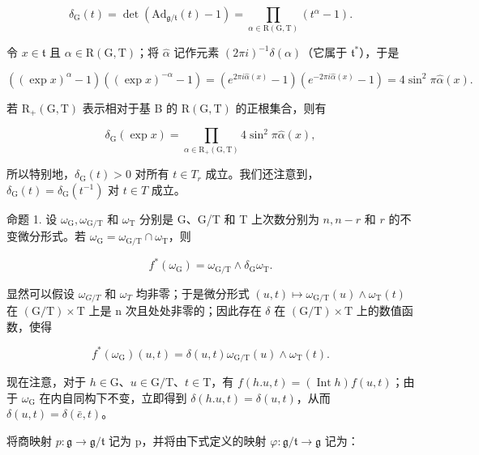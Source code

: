 \[
\delta_ {\mathrm{G}} (t) = \det (\mathrm{Ad} _ {\mathfrak {g} / \mathfrak {t}} (t) - 1) = \prod_ {\alpha \in \mathrm{R} (\mathrm{G}, \mathrm{T})} (t ^ {\alpha} - 1).\tag{3}
\]

令 \(x \in \mathfrak{t}\) 且 \(\alpha \in \mathrm{R}(\mathrm{G},\mathrm{T})\)；将 \(\hat{\alpha}\) 记作元素 \((2\pi i)^{-1}\delta (\alpha)\)（它属于 \(\mathfrak{t}^*\)），于是

\[
((\exp x) ^ {\alpha} - 1) ((\exp x) ^ {- \alpha} - 1) = (e ^ {2 \pi i \hat {\alpha} (x)} - 1) (e ^ {- 2 \pi i \hat {\alpha} (x)} - 1) = 4 \sin^ {2} \pi \hat {\alpha} (x).
\]

若 \(\mathrm{R}_{+}(\mathrm{G},\mathrm{T})\) 表示相对于基 B 的 \(\mathrm{R}(\mathrm{G},\mathrm{T})\) 的正根集合，则有

\[
\delta_ {\mathrm{G}} (\exp x) = \prod_ {\alpha \in \mathrm{R} _ {+} (\mathrm{G}, \mathrm{T})} 4 \sin^ {2} \pi \hat {\alpha} (x),
\]

所以特别地，\(\delta_{\mathrm{G}}(t)>0\) 对所有 \(t\in T_{r}\) 成立。我们还注意到，\(\delta_{\mathrm{G}}(t)=\delta_{\mathrm{G}}(t^{-1})\) 对 \(t\in T\) 成立。

命题 1. 设 \(\omega_{\mathrm{G}}, \omega_{\mathrm{G/T}}\) 和 \(\omega_{\mathrm{T}}\) 分别是 G、G/T 和 T 上次数分别为 \(n, n - r\) 和 \(r\) 的不变微分形式。若 \(\omega_{\mathrm{G}} = \omega_{\mathrm{G/T}} \cap \omega_{\mathrm{T}}\)，则

\[
f ^ {*} (\omega_ {\mathrm{G}}) = \omega_ {\mathrm{G/T}} \wedge \delta_ {\mathrm{G}} \omega_ {\mathrm{T}}.
\]

显然可以假设 \(\omega_{G/T}\) 和 \(\omega_{T}\) 均非零；于是微分形式 \((u,t)\mapsto\omega_{\mathrm{G/T}}(u)\wedge\omega_{\mathrm{T}}(t)\) 在 \((\mathrm{G/T})\times\mathrm{T}\) 上是 n 次且处处非零的；因此存在 \(\delta\) 在 \((\mathrm{G/T})\times\mathrm{T}\) 上的数值函数，使得

\[
f ^ {*} (\omega_ {\mathrm{G}}) (u, t) = \delta (u, t) \omega_ {\mathrm{G/T}} (u) \wedge \omega_ {\mathrm{T}} (t).
\]

现在注意，对于 \(h \in \mathrm{G}\)、\(u \in \mathrm{G} / \mathrm{T}\)、\(t \in \mathrm{T}\)，有 \(f(h.u,t) = (\operatorname{Int} h)f(u,t)\)；由于 \(\omega_{\mathrm{G}}\) 在内自同构下不变，立即得到 \(\delta(h.u,t) = \delta(u,t)\)，从而 \(\delta(u,t) = \delta(\bar{e},t)\)。

将商映射 \(p:\mathfrak{g}\to \mathfrak{g} / \mathfrak{t}\) 记为 p，并将由下式定义的映射 \(\varphi :\mathfrak{g} / \mathfrak{t}\rightarrow \mathfrak{g}\) 记为：

